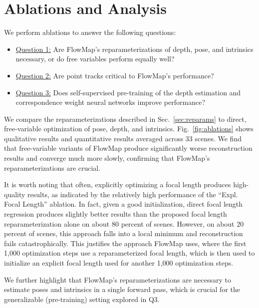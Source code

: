 
\section{Ablations and Analysis}
\label{sec:ablations}
We perform ablations to answer the following questions:
\setdefaultleftmargin{.5em}{0em}{}{}{}{}
\begin{itemize}
    \item \underline{Question 1:} Are FlowMap's reparameterizations of depth, pose, and intrinsics necessary, or do free variables perform equally well?
    \item \underline{Question 2:} Are point tracks critical to FlowMap's performance?
    \item \underline{Question 3:} Does self-supervised pre-training of the depth estimation and correspondence weight neural networks improve performance? 
\end{itemize}


We compare the reparameterizations described in Sec.~\ref{sec:reparams} to direct, free-variable optimization of pose, depth, and intrinsics.
Fig.~\ref{fig:ablations} shows qualitative results and quantitative results averaged across 33 scenes.
We find that free-variable variants of FlowMap produce significantly worse reconstruction results and converge much more slowly, confirming that FlowMap's reparameterizations are crucial.

It is worth noting that often, explicitly optimizing a focal length produces high-quality results, as indicated by the relatively high performance of the ``Expl. Focal Length'' ablation.
In fact, given a good initialization, direct focal length regression produces slightly better results than the proposed focal length reparameterization alone on about 80 percent of scenes.
However, on about 20 percent of scenes, this approach falls into a local minimum and reconstruction fails catastrophically.
This justifies the approach FlowMap uses, where the first 1,000 optimization steps use a reparameterized focal length, which is then used to initialize an explicit focal length used for another 1,000 optimization steps.

We further highlight that FlowMap's reparameterizations are necessary to estimate poses and intrinsics in a single forward pass, which is crucial for the generalizable (pre-training) setting explored in Q3.

